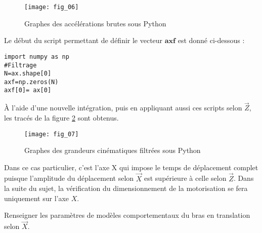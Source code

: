 \begin{figure}
\centering
\texttt{[image: fig\_06]}%
\caption{\label{fig:CCS_TSI_2021_fig_06}Graphes des accélérations brutes sous Python}
\end{figure}

Le début du script permettant de définir le vecteur $\boldsymbol{a x f}$ est donné ci-dessous :

\begin{verbatim}
import numpy as np
#Filtrage
N=ax.shape[0]
axf=np.zeros(N)
axf[0]= ax[0]
\end{verbatim}



À l'aide d'une nouvelle intégration, puis en appliquant aussi ces scripts selon $\vec{Z}$, les tracés de la figure \ref{fig:CCS_TSI_2021_fig_07} sont obtenus.

\begin{figure}
\centering
\texttt{[image: fig\_07]}%
\caption{\label{fig:CCS_TSI_2021_fig_07}Graphes des grandeurs cinématiques filtrées sous Python}
\end{figure}


Dans ce cas particulier, c'est l'axe X qui impose le temps de déplacement complet puisque l'amplitude du déplacement selon $\vec{X}$ est supérieure à celle selon $\vec{Z}$. Dans la suite du sujet, la vérification du dimensionnement de la motorisation se fera uniquement sur l'axe $X$.

Renseigner les paramètres de modèles comportementaux du bras en translation selon $\vec{X}$.

